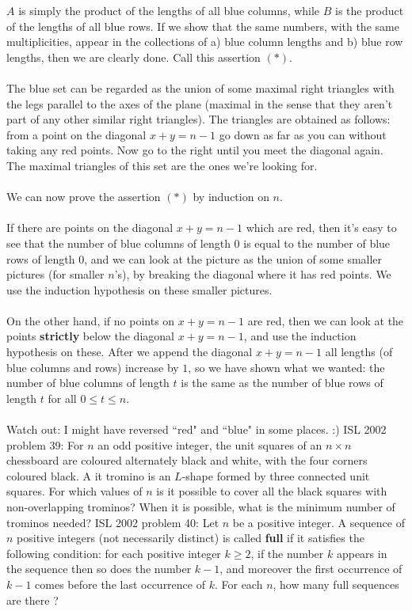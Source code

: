 $A$ is simply the product of the lengths of all blue columns, while $B$ is the product of the lengths of all blue rows. If we show that the same numbers, with the same multiplicities, appear in the collections of a) blue column lengths and b) blue row lengths, then we are clearly done. Call this assertion $(*)$. \\\\
The blue set can be regarded as the union of some maximal right triangles with the legs parallel to the axes of the plane (maximal in the sense that they aren't part of any other similar right triangles). The triangles are obtained as follows: from a point on the diagonal $x+y=n-1$ go down as far as you can without taking any red points. Now go to the right until you meet the diagonal again. The maximal triangles of this set are the ones we're looking for. \\\\
We can now prove the assertion $(*)$ by induction on $n$. \\\\
If there are points on the diagonal $x+y=n-1$ which are red, then it's easy to see that the number of blue columns of length $0$ is equal to the number of blue rows of length $0$, and we can look at the picture as the union of some smaller pictures (for smaller $n$'s), by breaking the diagonal where it has red points. We use the induction hypothesis on these smaller pictures. \\\\
On the other hand, if no points on $x+y=n-1$ are red, then we can look at the points \textbf{strictly} below the diagonal $x+y=n-1$, and use the induction hypothesis on these. After we append the diagonal $x+y=n-1$ all lengths (of blue columns and rows) increase by $1$, so we have shown what we wanted: the number of blue columns of length $t$ is the same as the number of blue rows of length $t$ for all $0\le t\le n$. \\\\
Watch out: I might have reversed ``red" and ``blue" in some places. :) 
ISL 2002 problem 39:  For $n$ an odd positive integer, the unit squares of an $n\times n$ chessboard are coloured alternately black and white, with the four corners coloured black. A it tromino is an $L$-shape formed by three connected unit squares. For which values of $n$ is it possible to cover all the black squares with non-overlapping trominos?  When it is possible, what is the minimum number of trominos needed? 
ISL 2002 problem 40:  Let $n$ be a positive integer. A sequence of $n$ positive integers (not necessarily distinct) is called \textbf{full} if it satisfies the following condition: for each positive integer $k\geq2$, if the number $k$ appears in the sequence then so does the number $k-1$, and moreover the first occurrence of $k-1$ comes before the last occurrence of $k$. For each $n$, how many full sequences are there ? 

